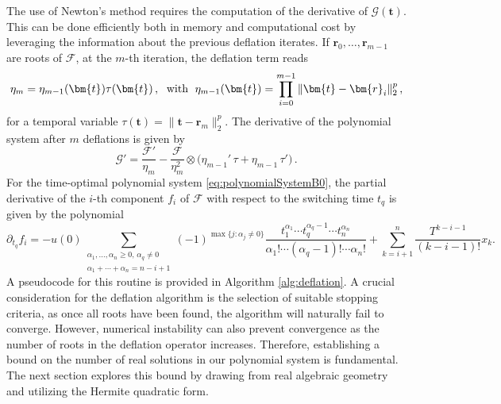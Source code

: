 \documentclass[11pt]{amsart}
\newcommand{\calF}{\mathcal{F}}
\theoremstyle{definition}
\theoremstyle{remark}
\numberwithin{equation}{section}
\begin{document}
 The use of Newton's method requires the computation of the derivative of $\mathcal{G}(\bm{t})$. This can be done efficiently both in memory and computational cost by leveraging the information about the previous deflation iterates. 
 If $\bm{r}_0,\dots,\bm{r}_{m-1}$ are roots of $\mathcal{F}$, at the {$m$-th} iteration, the deflation term reads
 \begin{equation*}
 \eta_m = \eta_{m-1}(\bm{t})\tau(\bm{t})\,,\; \text{ with\; }
 \eta_{m-1}(\bm{t}) = \prod\limits_{i=0}^{m-1}\|\bm{t}- \bm{r}_i \|_2^p\,,
 \end{equation*}
 for a temporal variable $\tau(\bm{t}) = \|\bm{t}- \bm{r}_m \|_2^p$.
 The derivative of the polynomial system after $m$ deflations is given by
 \begin{equation}\label{d_defl}
 \mathcal{G}' = \dfrac{\mathcal{F}'}{\eta_{m}} - \dfrac{\mathcal{F}}{\eta_{m}^2}\otimes\big(\eta_{m-1}'\,\tau + \eta_{m-1}\,\tau'\big)\,.
 \end{equation} 
For the time-optimal polynomial system \eqref{eq:polynomialSystemB0}, the partial derivative of the $i$-th component $f_i$ of $\calF$ with respect to the switching time $t_q$ is given by the polynomial
\begin{equation*}
\partial_{t_q}f_i=-u(0)\sum_{\substack{\alpha_1,\ldots,\alpha_n\geq0, \, \alpha_q\neq 0\\\alpha_1+\cdots+\alpha_n=n-i+1}}(-1)^{\max\{j\colon\alpha_j\neq0\}}\frac{t_1^{\alpha_1}\cdots t_q^{\alpha_q-1}\cdots t_n^{\alpha_n}}{\alpha_1!\cdots(\alpha_q-1)!\cdots\alpha_n!}+
\sum_{k=i+1}^{n}\frac{T^{k-i-1}}{(k-i-1)!}x_k.
\end{equation*}
 A pseudocode for this routine is provided in Algorithm \ref{alg:deflation}. A crucial consideration for the deflation algorithm is the selection of suitable stopping criteria, as once all roots have been found, the algorithm will naturally fail to converge. However, numerical instability can also prevent convergence as the number of roots in the deflation operator increases. Therefore, establishing a bound on the number of real solutions in our polynomial system is fundamental. The next section explores this bound by drawing from real algebraic geometry and utilizing the Hermite quadratic form.
\end{document}
